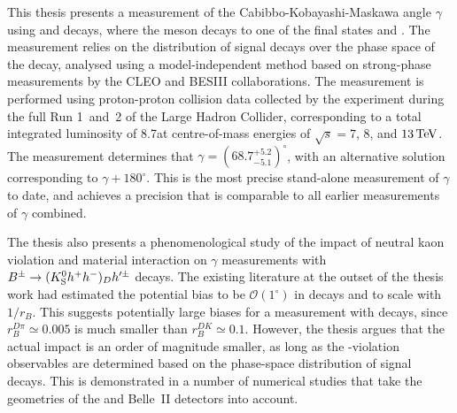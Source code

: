 This thesis presents a measurement of the Cabibbo-Kobayashi-Maskawa angle $\gamma$ using \BtoDK and \BtoDpi decays, where the \D meson decays to one of the final states \Kspipi and \KsKK.  The measurement relies on the distribution of signal decays over the phase space of the \D decay, analysed using a model-independent method based on strong-phase measurements by the CLEO and BESIII collaborations. The measurement is performed using proton-proton collision data collected by the \lhcb experiment during the full Run 1~and~2 of the Large Hadron Collider, corresponding to a total integrated luminosity of 8.7\invfb at centre-of-mass energies of $\sqrt s =7$, $8$, and $13\text{\,Te\kern -0.1em V}$. The measurement determines that $\gamma= (68.7^{+5.2}_{-5.1})^\circ$, with an alternative solution corresponding to $\gamma+180^\circ$. This is the most precise stand-alone measurement of $\gamma$ to date, and achieves a precision that is comparable to all earlier measurements of $\gamma$ combined. 

The thesis also presents a phenomenological study of the impact of neutral kaon \CP violation and material interaction on $\gamma$ measurements with ${{{B}^\pm}\rightarrow ({{K}^0_{\mathrm{S}}} h^+h^-)_D h'^\pm}$ decays. The existing literature at the outset of the thesis work had estimated the potential bias to be $\mathcal O(1^\circ)$ in \BtoDK decays and to scale with $1/r_B$. This suggests potentially large biases for a measurement with \BtoDpi decays, since $r_B^{D\pi}\simeq0.005$ is much smaller than $r_B^{DK}\simeq 0.1$. However, the thesis argues that the actual impact is an order of magnitude smaller, as long as the \CP-violation observables are determined based on the phase-space distribution of signal decays. This is demonstrated in a number of numerical studies that take the geometries of the \lhcb and Belle~II detectors into account.